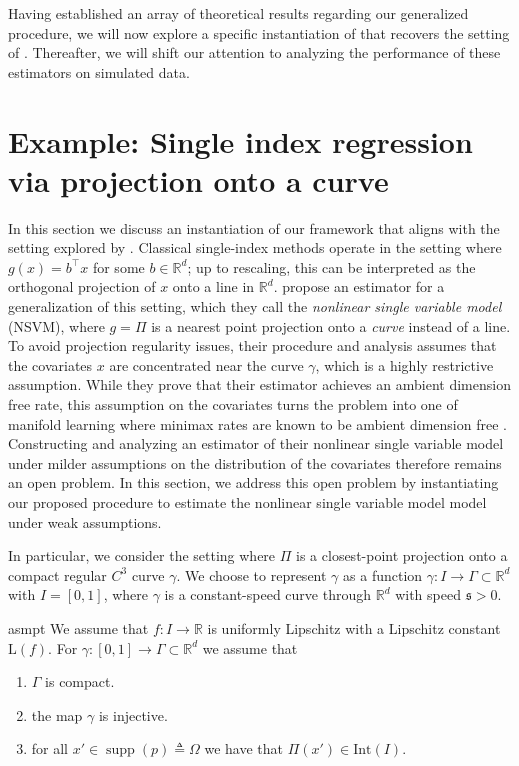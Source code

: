 \documentclass[11pt]{article}
\begin{document}
Having established an array of theoretical results regarding our generalized procedure, we will now explore a specific instantiation of that recovers the setting of \citet{wu2024conditional}. Thereafter, we will shift our attention to analyzing the performance of these estimators on simulated data. 

\section{Example: Single index regression via projection onto a curve} \label{sec: single variable model}

In this section we discuss an instantiation of our framework that aligns with the setting explored by \citet{wu2024conditional}. Classical single-index methods operate in the setting where $g(x) = b^{\top}x$ for some $b \in \mathbb{R}^d$; up to rescaling, this can be interpreted as the orthogonal projection of $x$ onto a line in $\mathbb{R}^d$. \citet{wu2024conditional} propose an estimator for a generalization of this setting, which they call the \textit{nonlinear single variable model} (NSVM), where $g = \Pi$ is a nearest point projection onto a \textit{curve} instead of a line. To avoid projection regularity issues, their procedure and analysis assumes that the covariates $x$ are concentrated near the curve $\gamma$, which is a highly restrictive assumption. While they prove that their estimator achieves an ambient dimension free rate, this assumption on the covariates turns the problem into one of manifold learning where minimax rates are known to be ambient dimension free \cite{genovese2012minimax}. Constructing and analyzing an estimator of their nonlinear single variable model under milder assumptions on the distribution of the covariates therefore remains an open problem. In this section, we address this open problem by instantiating our proposed procedure to estimate the nonlinear single variable model model under weak assumptions.

In particular, we consider the setting where $\Pi$ is a closest-point projection onto a compact regular $C^3$ curve $\gamma$. We choose to represent $\gamma$ as a function $\gamma:I \rightarrow \Gamma \subset \mathbb{R}^d$ with $I = [0, 1]$, where $\gamma$ is a constant-speed curve through $\mathbb{R}^d$ with speed $\mathfrak{s} > 0$.
\begin{restatable}{asmpt}{} \label{assumption: the curve gamma}
    We assume that $f: I \rightarrow \mathbb{R}$ is uniformly Lipschitz with a Lipschitz constant $\text{L}(f)$. For $\gamma: [0, 1]\rightarrow \Gamma \subset \mathbb{R}^d$ we assume that
    \begin{enumerate}
        \item $\Gamma$ is compact.
        \item the map $\gamma$ is injective.
        \item for all $x' \in \operatorname{supp}(p) \triangleq \Omega$ we have that $\Pi(x') \in \text{Int}(I)$.
    \end{enumerate}
\end{restatable}
\end{document}

